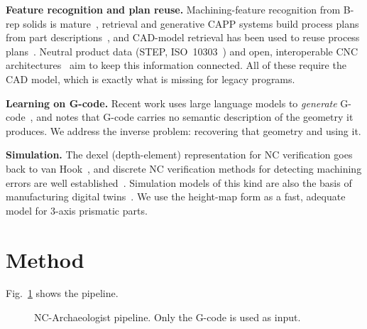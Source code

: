 \documentclass[conference]{IEEEtran}
\begin{document}
\textbf{Feature recognition and plan reuse.} Machining-feature recognition from
B-rep solids is mature~\cite{han2000}, retrieval and generative CAPP systems
build process plans from part descriptions~\cite{zhang1994}, and CAD-model
retrieval has been used to reuse process plans~\cite{pitta2005}. Neutral
product data (STEP, ISO~10303~\cite{iso10303}) and open, interoperable CNC
architectures~\cite{xu2006} aim to keep this information connected. All of
these require the CAD model, which is exactly what is missing for legacy programs.

\textbf{Learning on G-code.} Recent work uses large language models to
\emph{generate} G-code~\cite{abdelaal2025}, and notes that G-code carries no
semantic description of the geometry it produces. We address the inverse
problem: recovering that geometry and using it.

\textbf{Simulation.} The dexel (depth-element) representation for NC
verification goes back to van Hook~\cite{vanhook1986}, and discrete NC
verification methods for detecting machining errors are well
established~\cite{jerard1989}. Simulation models of this kind are also the
basis of manufacturing digital twins~\cite{tao2019}. We use the height-map
form as a fast, adequate model for 3-axis prismatic parts.

\section{Method}
Fig.~\ref{fig:arch} shows the pipeline.

\begin{figure}[t]
\centering
{}
\caption{NC-Archaeologist pipeline. Only the G-code is used as input.}
\label{fig:arch}
\end{figure}
\end{document}
